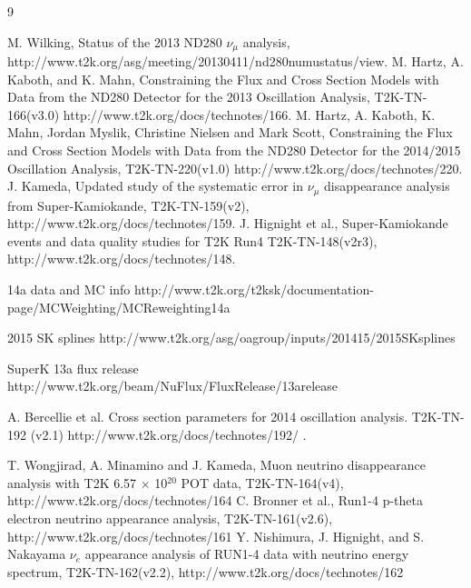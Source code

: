 \begin{thebibliography}{9}
%
%

  M. Wilking,
  Status of the 2013 ND280 $\nu_{\mu}$ analysis,\\
  http://www.t2k.org/asg/meeting/20130411/nd280numustatus/view.
  M. Hartz, A. Kaboth, and K. Mahn,
  Constraining the Flux and Cross Section Models with Data from the
  ND280 Detector for the 2013 Oscillation Analysis,
  T2K-TN-166(v3.0)
  http://www.t2k.org/docs/technotes/166.
  M. Hartz, A. Kaboth, K. Mahn, Jordan Myslik, Christine Nielsen and Mark Scott,
  Constraining the Flux and Cross Section Models with Data from the
  ND280 Detector for the 2014/2015 Oscillation Analysis,
  T2K-TN-220(v1.0)
  http://www.t2k.org/docs/technotes/220.
   J. Kameda,
   Updated study of the systematic error in $\nu_{\mu}$ disappearance analysis from Super-Kamiokande,
   T2K-TN-159(v2),
   http://www.t2k.org/docs/technotes/159.
   J. Hignight et al.,
   Super-Kamiokande events and data quality studies for T2K Run4
   T2K-TN-148(v2r3),
   http://www.t2k.org/docs/technotes/148.

%
%

   14a data and MC info
   http://www.t2k.org/t2ksk/documentation-page/MCWeighting/MCReweighting14a

   2015 SK splines
   http://www.t2k.org/asg/oagroup/inputs/201415/2015SKsplines

   SuperK 13a flux release
   http://www.t2k.org/beam/NuFlux/FluxRelease/13arelease
   
   A. Bercellie et al.
   Cross section parameters for 2014 oscillation analysis.
   T2K-TN-192 (v2.1)
   http://www.t2k.org/docs/technotes/192/ .
%
%
%


  T. Wongjirad, A. Minamino and J. Kameda,
  Muon neutrino disappearance analysis with T2K 6.57 $\times$ 10$^{20}$ POT data,
  T2K-TN-164(v4),
  http://www.t2k.org/docs/technotes/164
  C. Bronner et al.,
  Run1-4 p-theta electron neutrino appearance analysis,
  T2K-TN-161(v2.6),
  http://www.t2k.org/docs/technotes/161
  Y. Nishimura, J. Hignight, and S. Nakayama
  $\nu_e$ appearance analysis of RUN1-4 data with neutrino energy spectrum,
  T2K-TN-162(v2.2),
  http://www.t2k.org/docs/technotes/162
%
%


\end{thebibliography}

